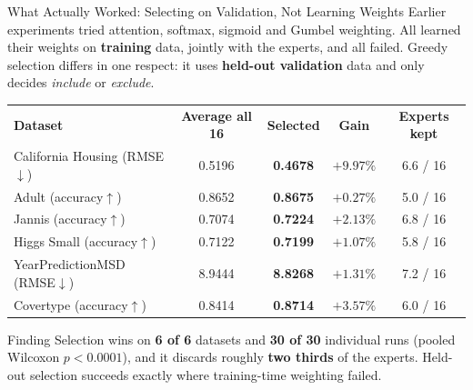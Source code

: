 \documentclass[aspectratio=169, xcolor=table]{beamer}
\begin{document}
\begin{frame}{What Actually Worked: Selecting on Validation, Not Learning Weights}
    \small
    Earlier experiments tried attention, softmax, sigmoid and Gumbel weighting. All learned their
    weights on \textbf{training} data, jointly with the experts, and all failed. Greedy selection
    differs in one respect: it uses \textbf{held-out validation} data and only decides
    \emph{include} or \emph{exclude}.
    \vspace{0.15cm}
    \begin{table}
        \centering
        \renewcommand{\arraystretch}{1.12}
        \footnotesize
        \begin{tabular}{l | c | c | c | c}
            \rowcolor{PrimaryColor} \color{white}\textbf{Dataset} & \color{white}\textbf{Average all 16} & \color{white}\textbf{Selected} & \color{white}\textbf{Gain} & \color{white}\textbf{Experts kept} \\
            California Housing (RMSE$\downarrow$) & 0.5196 & \textbf{0.4678} & $+9.97\%$ & 6.6 / 16 \\
            \rowcolor{LightGrey} Adult (accuracy$\uparrow$) & 0.8652 & \textbf{0.8675} & $+0.27\%$ & 5.0 / 16 \\
            Jannis (accuracy$\uparrow$) & 0.7074 & \textbf{0.7224} & $+2.13\%$ & 6.8 / 16 \\
            \rowcolor{LightGrey} Higgs Small (accuracy$\uparrow$) & 0.7122 & \textbf{0.7199} & $+1.07\%$ & 5.8 / 16 \\
            YearPredictionMSD (RMSE$\downarrow$) & 8.9444 & \textbf{8.8268} & $+1.31\%$ & 7.2 / 16 \\
            \rowcolor{LightGrey} Covertype (accuracy$\uparrow$) & 0.8414 & \textbf{0.8714} & $+3.57\%$ & 6.0 / 16 \\
        \end{tabular}
    \end{table}
    \vspace{-0.1cm}
    \begin{block}{Finding}
        Selection wins on \textbf{6 of 6} datasets and \textbf{30 of 30} individual runs
        (pooled Wilcoxon $p<0.0001$), and it discards roughly \textbf{two thirds} of the experts.
        Held-out selection succeeds exactly where training-time weighting failed.
    \end{block}
\end{frame}
\end{document}
